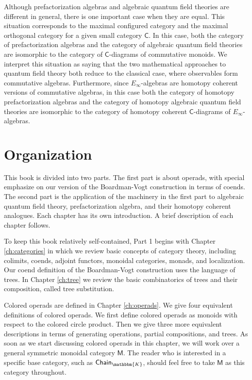 \documentclass{amsbook}
\numberwithin{section}{chapter}
\numberwithin{subsection}{section}
\numberwithin{equation}{section}
\theoremstyle{plain}
\theoremstyle{definition}
\newcommand{\fieldk}{\mathbbm{K}}
\newcommand{\C}{\mathsf{C}}
\newcommand{\M}{\mathsf{M}}
\newcommand{\Chaink}{\mathsf{Chain}_{\fieldk}}
\begin{document}
Although prefactorization algebras and algebraic quantum field theories are different in general, there is one important case when they are equal.  This situation corresponds to the maximal configured category and the maximal orthogonal category for a given small category $\C$.  In this case, both the category of prefactorization algebras and the category of algebraic quantum field theories are isomorphic to the category of $\C$-diagrams of commutative monoids.  We interpret this situation as saying that the two mathematical approaches to quantum field theory both reduce to the classical case, where observables form commutative algebras.  Furthermore, since $E_\infty$-algebras are homotopy coherent versions of commutative algebras, in this case both the category of homotopy prefactorization algebras and the category of homotopy algebraic quantum field theories are isomorphic to the category of homotopy coherent $\C$-diagrams of $E_\infty$-algebras.


\section{Organization}\label{sec:intro-organization}

This book is divided into two parts.  The first part is about operads, with special emphasize on our version of the Boardman-Vogt construction in terms of coends.  The second part is the application of the machinery in the first part to algebraic quantum field theory, prefactorization algebra, and their homotopy coherent analogues.  Each chapter has its own introduction.  A brief description of each chapter follows.

To keep this book relatively self-contained, Part 1 begins with Chapter \ref{ch:categories} in which we review basic concepts of category theory, including colimits, coends, adjoint functors, monoidal categories, monads, and localization.  Our coend definition of the Boardman-Vogt construction uses the language of trees.  In Chapter \ref{ch:tree} we review the basic combinatorics of trees and their composition, called tree substitution.

Colored operads are defined in Chapter \ref{ch:operads}.  We give four equivalent definitions of colored operads.  We first define colored operads as monoids with respect to the colored circle product.  Then we give three more equivalent descriptions in terms of generating operations, partial compositions, and trees.  As soon as we start discussing colored operads in this chapter, we will work over a general symmetric monoidal category $\M$.  The reader who is interested in a specific base category, such as $\Chaink$, should feel free to take $\M$ as this category throughout.
\end{document}
